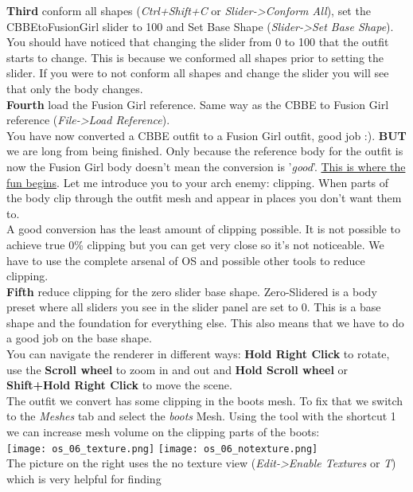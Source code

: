 \textbf{Third} conform all shapes (\textit{Ctrl+Shift+C} or \textit{Slider->Conform All}), 
set the CBBEtoFusionGirl slider to 100 and Set Base Shape (\textit{Slider->Set Base Shape}).
You should have noticed that changing the slider from 0 to 100 that the outfit starts to change. This is because we conformed all 
shapes prior to setting the slider. If you were to not conform all shapes and change the slider you will see that only the body changes.\\
\textbf{Fourth} load the Fusion Girl reference. Same way as the CBBE to Fusion Girl reference (\textit{File->Load Reference}).\\
You have now converted a CBBE outfit to a Fusion Girl outfit, good job :). \textbf{BUT} we are long from being finished. Only because 
the reference body for the outfit is now the Fusion Girl body doesn't mean the conversion is '\textit{good}'. 
\href{https://www.youtube.com/watch?v=KAHLwAxS7FI}{This is where the fun begins}. Let me introduce you to your arch enemy: clipping.
When parts of the body clip through the outfit mesh and appear in places you don't want them to.\\
A good conversion has the least amount of clipping possible. It is not possible to achieve true 0\% clipping but you can get very close 
so it's not noticeable. We have to use the complete arsenal of OS and possible other tools to reduce clipping.\\
\textbf{Fifth} reduce clipping for the zero slider base shape. Zero-Slidered is a body preset where all sliders you see in the slider panel 
are set to 0. This is a base shape and the foundation for everything else. This also means that we have to do a good job on the base shape.\\
You can navigate the renderer in different ways: \textbf{Hold Right Click} to rotate, use the \textbf{Scroll wheel} to zoom in and out and
\textbf{Hold Scroll wheel} or \textbf{Shift+Hold Right Click} to move the scene.\\
The outfit we convert has some clipping in the boots mesh. To fix that we switch to the \textit{Meshes} tab and select the \textit{boots} 
Mesh. Using the tool with the shortcut 1 we can increase mesh volume on the clipping parts of the boots:\\
\texttt{[image: os\_06\_texture.png]}
\texttt{[image: os\_06\_notexture.png]}\\
The picture on the right uses the no texture view (\textit{Edit->Enable Textures} or \textit{T}) which is very helpful for finding 
